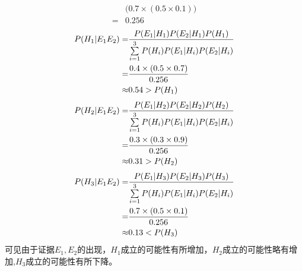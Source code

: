 \begin{answer}
\begin{subanswer}
\begin{align*}
    &\big(0.7 \times (0.5 \times 0.1)\big) \\
    =&0.256
    \end{align*}
    \begin{align}
    P(H_1|E_1E_2)=& \frac{P(E_1|H_1)P(E_2|H_1)P(H_1)} {\sum\limits_{i=1}^{3}P(H_i)P(E_1|H_i)P(E_2|H_i)} \notag\\
    =&\frac{0.4 \times (0.5 \times 0.7)}{0.256} \notag\\
    \approx&0.54>P(H_1)
    \end{align}
    \begin{align}
    P(H_2|E_1E_2)=& \frac{P(E_1|H_2)P(E_2|H_2)P(H_2)} {\sum\limits_{i=1}^{3}P(H_i)P(E_1|H_i)P(E_2|H_i)} \notag\\
    =&\frac{0.3 \times (0.3 \times 0.9)}{0.256} \notag\\
    \approx&0.31>P(H_2)
    \end{align}
    \begin{align}
    P(H_3|E_1E_2)=& \frac{P(E_1|H_3)P(E_2|H_3)P(H_3)} {\sum\limits_{i=1}^{3}P(H_i)P(E_1|H_i)P(E_2|H_i)} \notag\\
    =&\frac{0.7 \times (0.5 \times 0.1)}{0.256} \notag\\
    \approx&0.13<P(H_3)
    \end{align}
    可见由于证据$E_1,E_2$的出现，$H_1$成立的可能性有所增加，$H_2$成立的可能性略有增加,$H_3$成立的可能性有所下降。
\end{subanswer}
\end{answer}
